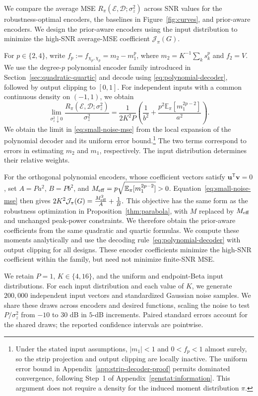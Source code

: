 \documentclass[journal,12pt,onecolumn,draftclsnofoot]{IEEEtran}
\newcommand{\enc}{\mathscr{E}}\newcommand{\dec}{\mathscr{D}}\newcommand{\R}{\mathbb R}\newcommand{\C}{\mathbb C}
\newcommand{\T}{\mathsf T}\newcommand{\suc}{\succeq}
\begin{document}
We compare the average MSE $R_\pi(\enc,\dec;\sigma_z^2)$ across SNR values for the robustness-optimal encoders, the baselines in Figure~\ref{fig:curves}, and prior-aware encoders. We design the prior-aware encoders using the input distribution to minimize the high-SNR average-MSE coefficient $\mathcal J_\pi(G)$.

For $p\in\{2,4\}$, write $f_p:=f_{\chi_p,\chi_p}=m_2-m_1^p$, where $m_2=K^{-1}\sum_k s_k^p$ and $f_2=V$. We use the degree-$p$ polynomial encoder family introduced in Section~\ref{sec:quadratic-quartic} and decode using \eqref{eq:polynomial-decoder}, followed by output clipping to $[0,1]$. For independent inputs with a common continuous density on $(-1,1)$, we obtain
\begin{equation}
 \lim_{\sigma_z^2\downarrow0}
 \frac{R_\pi(\enc,\dec;\sigma_z^2)}{\sigma_z^2}
 =\frac{1}{2K^2P}\left(\frac{1}{b^2}
 +\frac{p^2\mathbb E_\pi[m_1^{2p-2}]}{a^2}\right).
 \label{eq:small-noise-mse}
\end{equation}
We obtain the limit in \eqref{eq:small-noise-mse} from the local expansion of the polynomial decoder and its uniform error bound.\footnote{Under the stated
input assumptions, $|m_1|<1$ and $0<f_p<1$ almost surely, so
the strip projection and output clipping are locally inactive.
The uniform error bound in
Appendix~\ref{app:strip-decoder-proof} permits dominated
convergence, following Step~1 of
Appendix~\ref{genstat:information}. This argument does not
require a density for the induced moment distribution $\pi$.}
The two terms correspond to errors in estimating $m_2$ and $m_1$, respectively. The input distribution determines their relative weights. 

For the orthogonal polynomial encoders, whose coefficient
vectors satisfy $\boldsymbol u^\T\boldsymbol v=0$, set
$A=Pa^2$, $B=Pb^2$, and
$M_{\rm eff}=p\sqrt{\mathbb E_\pi[m_1^{2p-2}]}>0$.
Equation~\eqref{eq:small-noise-mse} then gives
$2K^2\mathcal J_\pi(G)=\frac{M_{\rm eff}^2}{A}+\frac1B.$
This objective has the same form as the robustness
optimization in Proposition~\ref{thm:parabola}, with
$M$ replaced by $M_{\rm eff}$ and unchanged peak-power
constraints. We therefore obtain the prior-aware
coefficients from the same quadratic and quartic formulas.
We compute these moments analytically and use the decoding rule~\eqref{eq:polynomial-decoder} with output clipping for all designs. These encoder coefficients minimize the high-SNR coefficient within the family, but need not minimize finite-SNR MSE.

We retain $P=1$, $K\in\{4,16\}$, and the uniform and endpoint-Beta input distributions. For each input distribution and each value of $K$, we generate $200{,}000$ independent input vectors and standardized Gaussian noise samples. We share these draws across encoders and desired functions, scaling the noise to test $P/\sigma_z^2$ from $-10$ to $30$ dB in $5$-dB increments. Paired standard errors account for the shared draws; the reported confidence intervals are pointwise.
\end{document}

